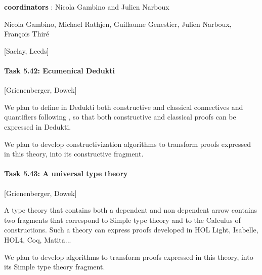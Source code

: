 {\bf coordinators} : Nicola Gambino and Julien Narboux 

Nicola Gambino, Michael Rathjen, Guillaume Genestier, Julien Narboux,
François Thiré

[Saclay, Leeds]

\paragraph{Task 5.42: Ecumenical Dedukti}

[Grienenberger, Dowek]

We plan to define in {\sc Dedukti} both constructive and classical
connectives and quantifiers
following \cite{PrawitzPereira,DowekPereira,Pereira}, so that both
constructive and classical proofs can be expressed in {\sc Dedukti}.

We plan to develop constructivization algorithms to transform proofs
expressed in this theory, into its constructive fragment.

\paragraph{Task 5.43: A universal type theory}

[Grienenberger, Dowek]

A type theory that contains both a dependent and non dependent arrow
contains two fragments that correspond to Simple type theory and to
the Calculus of constructions. Such a theory can express proofs
developed in HOL Light, Isabelle, HOL4, Coq, Matita...

We plan to develop algorithms to transform proofs expressed in this
theory, into its Simple type theory fragment.
